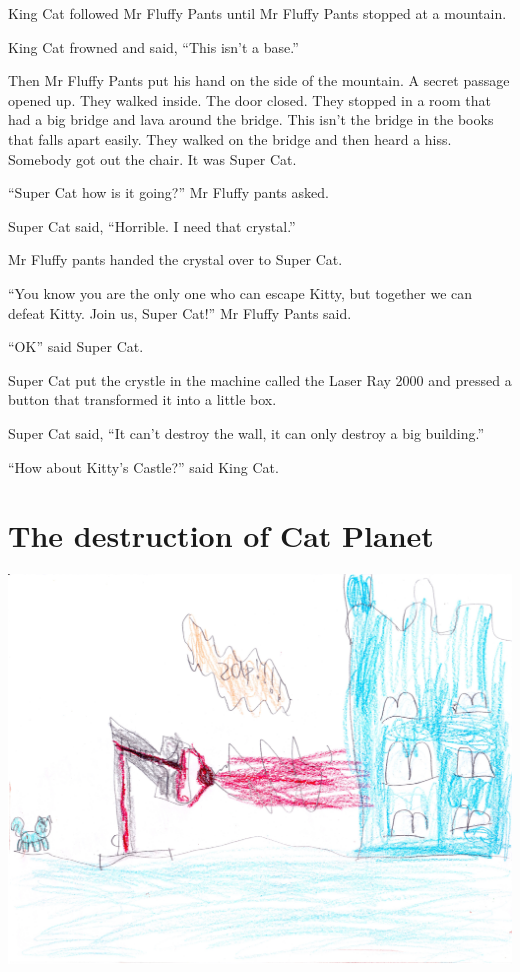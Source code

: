 \documentclass[12pt,oneside]{krantz}
\begin{document}
King Cat followed Mr Fluffy Pants until Mr Fluffy Pants stopped at a
mountain.

King Cat frowned and said, ``This isn't a base.''

Then Mr Fluffy Pants put his hand on the side of the mountain. A secret
passage opened up. They walked inside. The door closed. They stopped in
a room that had a big bridge and lava around the bridge. This isn't the
bridge in the books that falls apart easily. They walked on the bridge
and then heard a hiss. Somebody got out the chair. It was Super Cat.

``Super Cat how is it going?'' Mr Fluffy pants asked.

Super Cat said, ``Horrible. I need that crystal.''

Mr Fluffy pants handed the crystal over to Super Cat.

``You know you are the only one who can escape Kitty, but together we
can defeat Kitty. Join us, Super Cat!'' Mr Fluffy Pants said.

``OK'' said Super Cat.

Super Cat put the crystle in the machine called the Laser Ray 2000 and
pressed a button that transformed it into a little box.

Super Cat said, ``It can't destroy the wall, it can only destroy a big
building.''

``How about Kitty's Castle?'' said King Cat.

\hypertarget{the-destruction-of-cat-planet}{%
\chapter{The destruction of Cat
Planet}\label{the-destruction-of-cat-planet}}

\includegraphics{img/laser.jpg}
\end{document}
